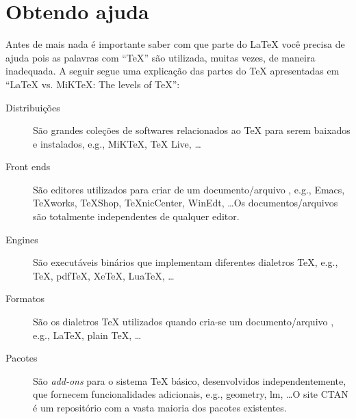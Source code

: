 % 
% 
% 
% 
% 
% 
%
%
\chapter{Obtendo ajuda} \label{sch:get_help}
Antes de mais nada é importante saber com que parte do LaTeX você precisa de ajuda pois as palavras com ``TeX'' são utilizada, muitas vezes, de maneira inadequada. A seguir segue uma explicação das partes do TeX apresentadas em ``LaTeX vs. MiKTeX: The levels of TeX''\nocite{TUG:Levels}:
\begin{description}
    \item[Distribuições] São grandes coleções de softwares relacionados ao TeX para serem baixados e instalados, e.g., MiKTeX, TeX Live, \ldots 
    \item[Front ends] São editores utilizados para criar de um documento/arquivo , e.g., Emacs, TeXworks, TeXShop, TeXnicCenter, WinEdt, \ldots Os documentos/arquivos  são totalmente independentes de qualquer editor.
    \item[Engines] São executáveis binários que implementam diferentes dialetros TeX, e.g., TeX, pdfTeX, XeTeX, LuaTeX, \ldots
    \item[Formatos] São os dialetros TeX utilizados quando cria-se um documento/arquivo , e.g., LaTeX, plain TeX, \ldots
    \item[Pacotes] São \textit{add-ons} para o sistema TeX básico, desenvolvidos independentemente, que fornecem funcionalidades adicionais, e.g., geometry, lm, \ldots O site CTAN é um repositório com a vasta maioria dos pacotes existentes.
\end{description}

